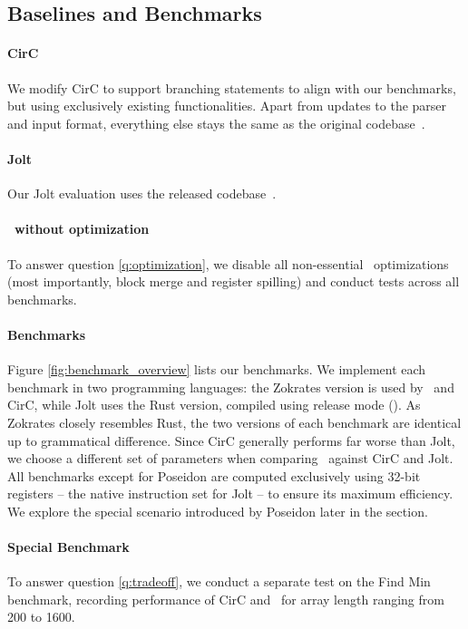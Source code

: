 \subsection{Baselines and Benchmarks}
\paragraph{CirC} We modify CirC to support branching statements to align with our benchmarks, but using exclusively existing functionalities. Apart from updates to the parser and input format, everything else stays the same as the original codebase~\cite{circ_codebase}.

\paragraph{Jolt} Our Jolt evaluation uses the released codebase~\cite{jolt_codebase}.

\paragraph{\CoBBl~without optimization} To answer question \ref{q:optimization}, we disable all non-essential \CoBBl~optimizations (most importantly, block merge and register spilling) and conduct tests across all benchmarks.

\paragraph{Benchmarks} Figure \ref{fig:benchmark_overview} lists our benchmarks. We implement each benchmark in two programming languages: the Zokrates version is used by \CoBBl~and CirC, while Jolt uses the Rust version, compiled using release mode (). As Zokrates closely resembles Rust, the two versions of each benchmark are identical up to grammatical difference. Since CirC generally performs far worse than Jolt, we choose a different set of parameters when comparing \CoBBl~against CirC and Jolt. All benchmarks except for Poseidon are computed exclusively using 32-bit registers -- the native instruction set for Jolt -- to ensure its maximum efficiency. We explore the special scenario introduced by Poseidon later in the section.

\paragraph{Special Benchmark} To answer question \ref{q:tradeoff}, we conduct a separate test on the Find Min benchmark, recording performance of CirC and \CoBBl~for array length ranging from 200 to 1600.


